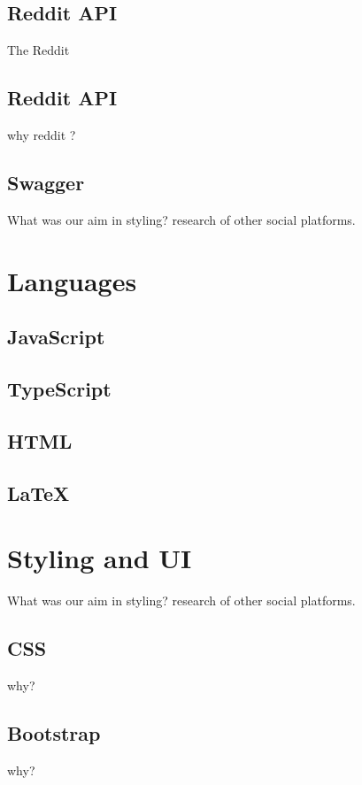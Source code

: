 \subsection{Reddit API}
The Reddit

\subsection{Reddit API}
why reddit ?

\subsection{Swagger}

What was our aim in styling? research of other social platforms.

\section{Languages}
\subsection{JavaScript}

\subsection{TypeScript}

\subsection{HTML}

\subsection{LaTeX}

\section{Styling and UI}
What was our aim in styling? research of other social platforms.

\subsection{CSS}
why?

\subsection{Bootstrap}
why?

